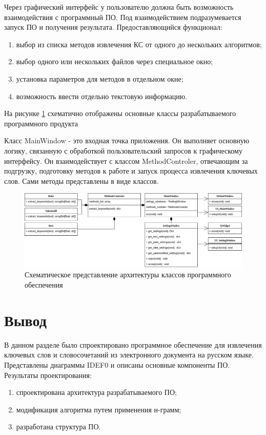 Через графический интерфейс у пользователю должна быть возможность взаимодействия с программный ПО. 
Под взаимодействием подразумевается запуск ПО и получения результата.
Предоставляющийся функционал:
\begin{enumerate}
	\item выбор из списка методов извлечения КС от одного до нескольких алгоритмов;
	\item выбор одного или нескольких файлов через специальное окно;
	\item установка параметров для методов в отдельном окне;
	\item возможность ввести отдельно текстовую информацию.
\end{enumerate}

На рисунке \ref{fig:classdiagram} схематично отображены основные классы разрабатываемого программного продукта

Класс MainWindow - это входная точка приложения.
Он выполняет основную логику, связанную с обработкой пользовательский запросов к графическому интерфейсу.
Он взаимодействует с классом MethodControler, отвечающим за подгрузку, подготовку методов к работе и запуск процесса извлечения ключевых слов. Сами методы представлены в виде классов.

\begin{figure}[!h]
	\centering
	\includegraphics[width=0.9\linewidth]{src/img/class_diagram}
	\caption{Схематическое представление архитектуры классов программного обеспечения}
	\label{fig:classdiagram}
\end{figure}

\section{Вывод}
В данном разделе было спроектировано программное обеспечение для извлечения ключевых слов и словосочетаний из электронного документа на русском языке. 
Представлены диаграммы IDEF0 и описаны основные компоненты ПО.
Результаты проектирования:
\begin{enumerate}
	\item спроектирована архитектура разрабатываемого ПО;
	\item модификация алгоритма путем применения н-грамм;
	\item разработана структура ПО.
\end{enumerate}


